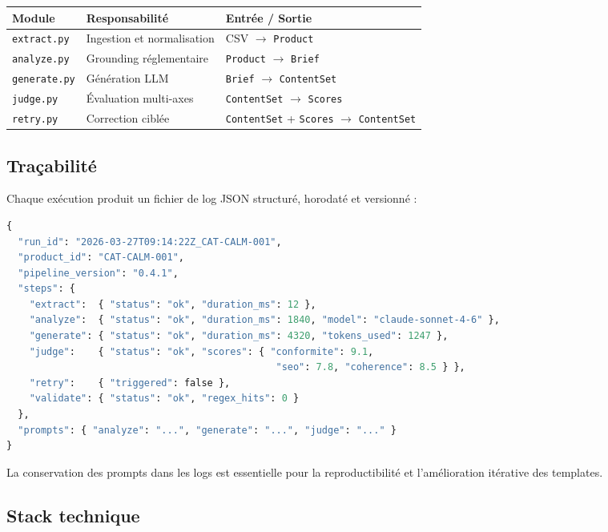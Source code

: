 \documentclass[11pt,a4paper]{article}
\begin{document}
\begin{center}
\renewcommand{\arraystretch}{1.3}
\begin{tabular}{lll}
\toprule
\textbf{Module} & \textbf{Responsabilité} & \textbf{Entrée / Sortie} \\
\midrule
\texttt{extract.py}  & Ingestion et normalisation & CSV $\to$ \texttt{Product} \\
\texttt{analyze.py}  & Grounding réglementaire    & \texttt{Product} $\to$ \texttt{Brief} \\
\texttt{generate.py} & Génération LLM             & \texttt{Brief} $\to$ \texttt{ContentSet} \\
\texttt{judge.py}    & Évaluation multi-axes      & \texttt{ContentSet} $\to$ \texttt{Scores} \\
\texttt{retry.py}    & Correction ciblée          & \texttt{ContentSet} + \texttt{Scores} $\to$ \texttt{ContentSet} \\
\bottomrule
\end{tabular}
\end{center}

\subsection{Traçabilité}

Chaque exécution produit un fichier de log JSON structuré, horodaté et versionné :

\begin{lstlisting}[language=Python, caption={Structure d'un log d'exécution}]
{
  "run_id": "2026-03-27T09:14:22Z_CAT-CALM-001",
  "product_id": "CAT-CALM-001",
  "pipeline_version": "0.4.1",
  "steps": {
    "extract":  { "status": "ok", "duration_ms": 12 },
    "analyze":  { "status": "ok", "duration_ms": 1840, "model": "claude-sonnet-4-6" },
    "generate": { "status": "ok", "duration_ms": 4320, "tokens_used": 1247 },
    "judge":    { "status": "ok", "scores": { "conformite": 9.1,
                                               "seo": 7.8, "coherence": 8.5 } },
    "retry":    { "triggered": false },
    "validate": { "status": "ok", "regex_hits": 0 }
  },
  "prompts": { "analyze": "...", "generate": "...", "judge": "..." }
}
\end{lstlisting}

La conservation des prompts dans les logs est essentielle pour la reproductibilité et
l'amélioration itérative des templates.

\subsection{Stack technique}
\end{document}
